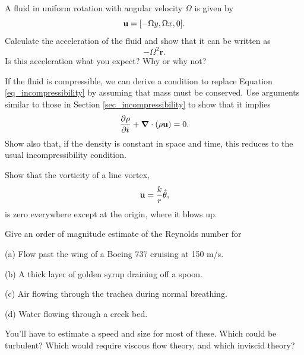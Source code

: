 \begin{problem}
A fluid in uniform rotation with angular velocity $\Omega$ is given by
\[
\mathbf{u} = [-\Omega y, \Omega x, 0].
\]
Calculate the acceleration of the fluid and show that it can be written as
\[
-\Omega^2 \mathbf{r}.
\]
Is this acceleration what you expect?  Why or why not?
\end{problem}


\begin{problem}
If the fluid is compressible, we can derive a condition to replace Equation \ref{eq_incompressibility} by assuming that mass must be conserved.  Use arguments similar to those in Section \ref{sec_incompressibility} to show that it implies
\begin{equation}
\frac{\partial \rho}{\partial t} + \boldsymbol{\nabla} \cdot (\rho \mathbf{u} ) = 0.
\end{equation}
Show also that, if the density is constant in space and time, this reduces to the usual incompressibility condition.
\end{problem}


\begin{problem}
\label{prob_vortex_vorticity}
Show that the vorticity of a line vortex, 
\[
\mathbf{u} = \frac{k}{r} \hat{\theta},
\]
is zero everywhere except at the origin, where it blows up.
\end{problem}



\begin{problem}

Give an order of magnitude estimate of the Reynolds number for

(a) Flow past the wing of a Boeing 737 cruising at 150 m/s.

(b) A thick layer of golden syrup draining off a spoon.

(c) Air flowing through the trachea during normal breathing.

(d) Water flowing through a creek bed.

You'll have to estimate a speed and size for most of these.  Which could be turbulent?  Which would require viscous flow theory, and which inviscid theory?

\end{problem}
